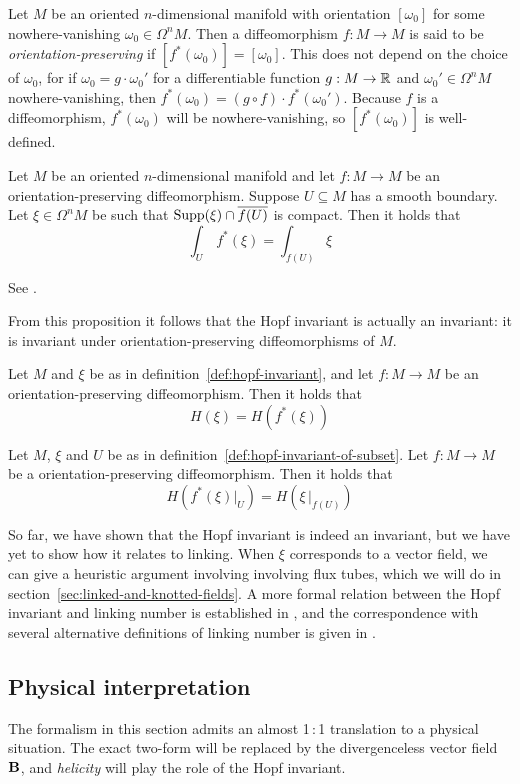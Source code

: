 Let $M$ be an oriented $n$-dimensional manifold
with orientation $[\omega_0]$ for some nowhere-vanishing $\omega_0 \in \Omega^n M$.
Then a diffeomorphism $f : M \to M$ is said to be \emph{orientation-preserving}
if $[f^*(\omega_0)] = [\omega_0]$.
This does not depend on the choice of $\omega_0$,
for if $\omega_0 = g \cdot \omega_0'$
for a differentiable function $g : M \to \mathbb{R}$ and $\omega_0' \in \Omega^n M$ nowhere-vanishing,
then $f^*(\omega_0) = (g \circ f) \cdot f^*(\omega_0')$.
Because $f$ is a diffeomorphism,
$f^*(\omega_0)$ will be nowhere-vanishing,
so $[f^*(\omega_0)]$ is well-defined.

Let $M$ be an oriented $n$-dimensional manifold
and let $f : M \to M$ be an orientation-preserving diffeomorphism.
Suppose $U \subseteq M$ has a smooth boundary.
Let $\xi \in \Omega^n M$ be such that $\operatorname{Supp}(\xi) \cap \overline{f(U)}$ is compact.
Then it holds that
\[ \int_U \, f^*(\xi) = \int_{f(U)} \xi \]

\vspace{-\parskip}
\proof
See \parencite[p.~148]{warner1971}.

From this proposition it follows that the Hopf invariant is actually an invariant:
it is invariant under orientation-preserving diffeomorphisms of $M$.

Let $M$ and $\xi$ be as in definition~\ref{def:hopf-invariant},
and let $f : M \to M$ be an orientation-preserving diffeomorphism.
Then it holds that
\[ H(\xi) = H(f^*(\xi)) \]

Let $M$, $\xi$ and $U$ be as in definition~\ref{def:hopf-invariant-of-subset}.
Let $f : M \to M$ be a orientation-preserving diffeomorphism.
Then it holds that
\[ H(f^*(\xi)|_U) = H(\xi\,|_{f(U)}) \]

\vspace{-\parskip}
So far, we have shown that the Hopf invariant is indeed an invariant,
but we have yet to show how it relates to linking.
When $\xi$ corresponds to a vector field,
we can give a heuristic argument involving involving flux tubes,
which we will do in section~\ref{sec:linked-and-knotted-fields}.
A more formal relation between the Hopf invariant and linking number
is established in \parencite{arnold1974},
and the correspondence with several alternative definitions of linking number
is given in \parencite[pp.~229–234]{bott1982}.

\subsection*{Physical interpretation}
The formalism in this section admits an almost 1\,:\,1 translation
to a physical situation.
The exact two-form will be replaced by the divergenceless vector field $\mathbf{B}$,
and \emph{helicity} will play the role of the Hopf invariant.

